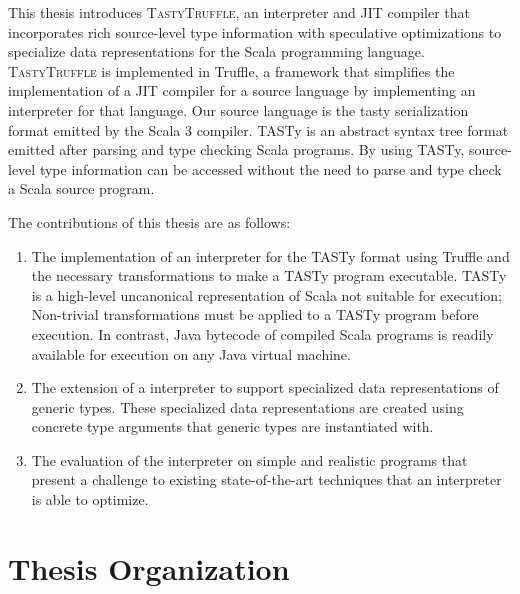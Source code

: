 This thesis introduces \textsc{TastyTruffle}, an interpreter and JIT compiler that incorporates rich source-level type information with speculative optimizations to specialize data representations for the Scala programming language.
\textsc{TastyTruffle} is implemented in Truffle, a framework that simplifies the implementation of a JIT compiler for a source language by implementing an interpreter for that language. 
Our source language is the \acrfull{tasty} serialization format emitted by the Scala 3 compiler.
TASTy is an abstract syntax tree format emitted after parsing and type checking Scala programs.
By using TASTy, source-level type information can be accessed without the need to parse and type check a Scala source program.

The contributions of this thesis are as follows: 
\begin{enumerate}
	\item The implementation of an interpreter for the TASTy format using Truffle and the necessary transformations to make a TASTy program executable. TASTy is a high-level uncanonical representation of Scala not suitable for execution; Non-trivial transformations must be applied to a TASTy program before execution.
	In contrast, Java bytecode of compiled Scala programs is readily available for execution on any Java virtual machine.
	\item The extension of a interpreter to support specialized data representations of generic types.
	These specialized data representations are created using concrete type arguments that generic types are instantiated with.
	\item The evaluation of the interpreter on simple and realistic programs that present a challenge to existing state-of-the-art techniques that an interpreter is able to optimize.
\end{enumerate}

\newpage

\section{Thesis Organization}

